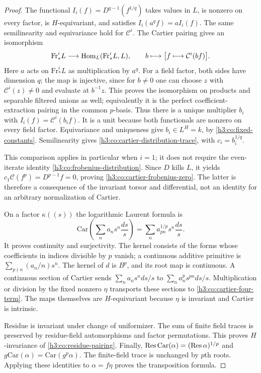 \begin{proof}
The functional $I_i(f)=D^{q-1}(f^{1/q})$ takes values in $L$, is nonzero
on every factor, is $H$-equivariant, and satisfies
$I_i(a^qf)=aI_i(f)$.  The same semilinearity and equivariance hold for
$\mathcal C^i$.  The Cartier pairing gives an isomorphism
\begin{equation}\label{h3:co:perfect-cartier-pairing}
 \mathrm{Fr}^i_*L\longrightarrow
 \operatorname{Hom}_L(\mathrm{Fr}^i_*L,L),\qquad
 b\longmapsto\bigl[f\longmapsto\mathcal C^i(bf)\bigr].
\end{equation}
Here $a$ acts on $\mathrm{Fr}^i_*L$ as multiplication by $a^q$.
For a field factor, both sides have dimension $q$; the map is injective,
since for $b\ne0$ one can choose $z$ with $\mathcal C^i(z)\ne0$ and
evaluate at $b^{-1}z$.  This proves the isomorphism on products and
separable filtered unions as well; equivalently it is the perfect
coefficient-extraction pairing in the common $p$-basis.
Thus there is a unique multiplier $b_i$ with
$I_i(f)=\mathcal C^i(b_if)$.  It is a unit because both functionals
are nonzero on every field factor.  Equivariance and uniqueness give
$b_i\in L^H=k$, by \eqref{h3:co:fixed-constants}.  Semilinearity gives
\eqref{h3:co:cartier-distribution-trace}, with $c_i=b_i^{1/q}$.

This comparison applies in particular when $i=1$; it does not require
the even-iterate identity \eqref{h3:co:frobenius-distribution}.  Since $D$
kills $L$, it yields
$c_1\mathcal C(f^p)=D^{p-1}f=0$, proving
\eqref{h3:co:cartier-frobenius-zero}.  The latter is therefore a consequence
of the invariant torsor and differential, not an identity for an
arbitrary normalization of Cartier.

On a factor $\kappa((s))$ the logarithmic Laurent formula is
\begin{equation}\label{h3:co:cartier-laurent}
 \mathrm{Car}\!\left(\sum_n a_ns^n\frac{ds}{s}\right)
 =\sum_n a_{pn}^{1/p}s^n\frac{ds}{s}.
\end{equation}
It proves continuity and surjectivity.  The kernel consists of the forms
whose coefficients in indices divisible by $p$ vanish; a continuous
additive primitive is $\sum_{p\nmid n}(a_n/n)s^n$.
The kernel of $d$ is $B^p$, and its root map is continuous.
A continuous section of Cartier sends
$\sum_n a_ns^n ds/s$ to $\sum_n a_n^ps^{pn}ds/s$.
Multiplication or division by the fixed nonzero $\eta$ transports these
sections to \eqref{h3:co:cartier-four-term}.  The maps themselves are
$H$-equivariant because $\eta$ is invariant and Cartier is intrinsic.

Residue is invariant under change of uniformizer.  The sum of finite
field traces is preserved by residue-field automorphisms and factor
permutations.  This proves $H$-invariance of
\eqref{h3:co:residue-pairing}.  Finally,
$\operatorname{Res}\mathrm{Car}(\alpha)=(\operatorname{Res}\alpha)^{1/p}$ and
$g\mathrm{Car}(\alpha)=\mathrm{Car}(g^p\alpha)$.
The finite-field trace is unchanged by $p$th roots.  Applying these
identities to $\alpha=f\eta$ proves the transposition formula.
\end{proof}

